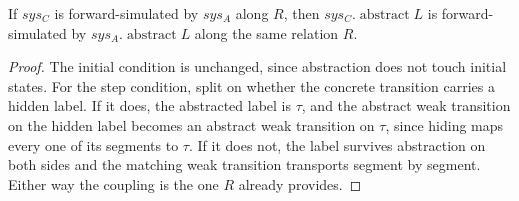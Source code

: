 \begin{theorem}
  \label{thm:precong-abstract}
  \leanok
  If $sys_C$ is forward-simulated by $sys_A$ along $R$, then
  $sys_C.\operatorname{abstract} L$ is forward-simulated by
  $sys_A.\operatorname{abstract} L$ along the same relation $R$.
\end{theorem}

\begin{proof}\leanok
  The initial condition is unchanged, since abstraction does not touch initial
  states. For the step condition, split on whether the concrete transition
  carries a hidden label. If it does, the abstracted label is $\tau$, and the
  abstract weak transition on the hidden label becomes an abstract weak
  transition on $\tau$, since hiding maps every one of its segments to $\tau$.
  If it does not, the label survives abstraction on both sides and the matching
  weak transition transports segment by segment. Either way the coupling is the
  one $R$ already provides.
\end{proof}
